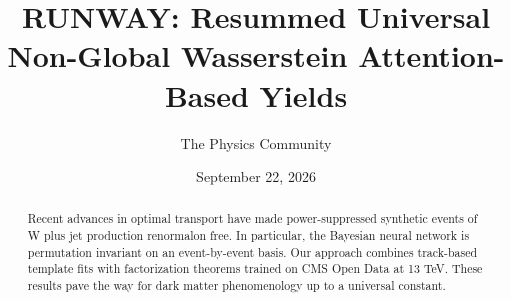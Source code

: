 \documentclass[11pt]{article}
\title{RUNWAY: Resummed Universal Non-Global Wasserstein Attention-Based Yields}
\author{The Physics Community}
\date{September 22, 2026}
\begin{document}
\maketitle
\begin{abstract}
Recent advances in optimal transport have made power-suppressed
synthetic events of W plus jet production renormalon free. In
particular, the Bayesian neural network is permutation invariant on an
event-by-event basis. Our approach combines track-based template fits
with factorization theorems trained on CMS Open Data at 13 TeV. These
results pave the way for dark matter phenomenology up to a universal
constant.
\end{abstract}
\tableofcontents




\nocite{*}


\end{document}
